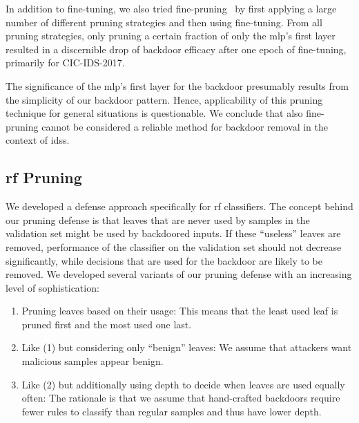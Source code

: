 \documentclass[9pt,sigconf,letterpaper,dvipsnames\ifx\removeHeaders\tempYes ,nonacm\fi]{acmart}
\newcommand\note[2]{{\color{#1}#2}}
\newcommand\todo[1]{{\note{red}{TODO: #1}}}
\newcommand{\cic}{CIC-IDS-2017}
\begin{document}
In addition to fine-tuning, we also tried fine-pruning~\cite{liu_fine-pruning:_2018} by first applying a large number of different pruning strategies and then using fine-tuning. From all pruning strategies, only pruning a certain fraction of only the \gls{mlp}'s first layer resulted in a discernible drop of backdoor efficacy after one epoch of fine-tuning, primarily for \cic{}.

The significance of the \gls{mlp}'s first layer for the backdoor presumably results from the simplicity of our backdoor pattern. Hence, applicability of this pruning technique for general situations is questionable. We conclude that also fine-pruning cannot be considered a reliable method for backdoor removal in the context of \glspl{ids}.


\subsection{\gls{rf} Pruning}

We developed a defense approach specifically for \gls{rf} classifiers.
The concept behind our pruning defense is that leaves that are never used by samples in the validation set might be used by backdoored inputs. If these ``useless'' leaves are removed, performance of the classifier on the validation set should not decrease
significantly,
while decisions that are used for the backdoor are likely to be removed.
We developed several variants of our pruning defense with an increasing level of sophistication:
\begin{enumerate}[wide, labelwidth=!, labelindent=0pt]
\item Pruning leaves based on their usage: This means that the least used leaf is pruned first and the most used one last.
\item Like (1) but considering only ``benign'' leaves: We assume that attackers want malicious samples appear benign.
\item Like (2) but additionally using depth to decide when
leaves are used equally often: The rationale is that we assume that hand-crafted backdoors require fewer rules to classify than regular samples and thus have lower depth.
\end{enumerate}
\end{document}
